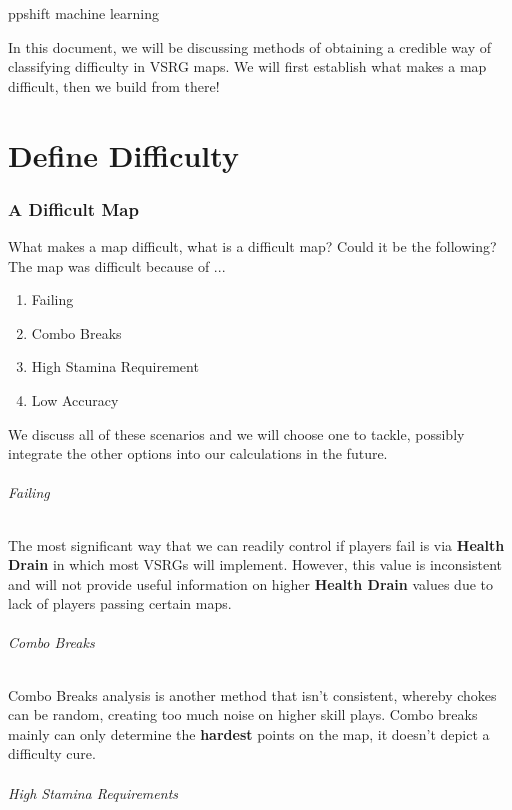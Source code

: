 \documentclass{article}
\begin{document}
	ppshift machine learning
	
	In this document, we will be discussing methods of obtaining a credible way of classifying difficulty in VSRG maps. We will first establish what makes a map difficult, then we build from there!
	
\part{Define Difficulty}
\section{A Difficult Map}

	What makes a map difficult, what is a difficult map? Could it be the following?
	The map was difficult because of ...
\begin{enumerate}
	\item Failing
	\item Combo Breaks
	\item High Stamina Requirement
	\item Low Accuracy
\end{enumerate}
We discuss all of these scenarios and we will choose one to tackle, possibly integrate the other options into our calculations in the future.

\paragraph{Failing}

The most significant way that we can readily control if players fail is via \textbf{Health Drain} in which most VSRGs will implement. However, this value is inconsistent and will not provide useful information on higher \textbf{Health Drain} values due to lack of players passing certain maps.

\paragraph{Combo Breaks}

Combo Breaks analysis is another method that isn't consistent, whereby chokes can be random, creating too much noise on higher skill plays. Combo breaks mainly can only determine the \textbf{hardest} points on the map, it doesn't depict a difficulty cure.

\paragraph{High Stamina Requirements}
\end{document}
